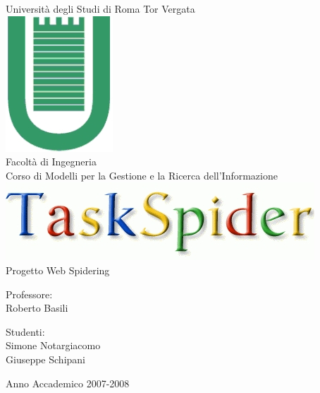 \begin{titlepage}
\begin{center}
\LARGE{Università degli Studi di Roma Tor Vergata}\\
\vspace{10mm}
\includegraphics[scale=0.50]{etc/logo1.jpg}\\
Facoltà di Ingegneria\\
\vspace{5mm}
\normalsize{Corso di Modelli per la Gestione e la Ricerca dell'Informazione}\\
\vspace{20mm}
\includegraphics[scale=0.40]{etc/taskspiderlogo.jpg}\\
\large{Progetto Web Spidering}\\
\end{center}
\vspace{40mm}
\begin{minipage}[t]{0.30\textwidth}
\begin{center}
{\normalsize{Professore:\\
Roberto Basili}}
\end{center}
\end{minipage}
\hfill
\begin{minipage}[t]{0.30\textwidth}
\begin{center}
{\normalsize{Studenti:\\
Simone Notargiacomo\\
Giuseppe Schipani}}
\end{center}
\end{minipage}
\vspace{10mm}
\begin{center}
Anno Accademico 2007-2008
\end{center}

\end{titlepage}